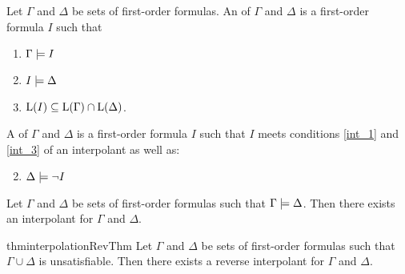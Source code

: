 \begin{defi}
	\label{def:interpolant}
	Let $\Gamma$ and $\Delta$ be sets of first-order formulas.
	An  of $\Gamma$ and $\Delta$ is a first-order formula $I$ such that 
	\begin{enumerate}
		\item $ \Gamma \models I$ \label{int_1}
		\item $ I \models \Delta $  \label{int_2}
		\item $ \operatorname{L}(I) \subseteq \operatorname{L}(\Gamma) \cap \operatorname{L}(\Delta)$.  \label{int_3}
	\end{enumerate}

	\begin{samepage}
		A  of $\Gamma$ and $\Delta$ is a first-order formula $I$ such that $I$ meets conditions \ref{int_1} and \ref{int_3} of an interpolant as well as:
		\begin{enumerate}[\quad\:1'.]
				\setcounter{enumi}{1}
			\item $ \Delta \models \lnot I $  \label{int_2prime}
				\qedhere
		\end{enumerate}
	\end{samepage}
\end{defi}

\begin{thm}[Interpolation]
	\label{thm:interpolation_original}
	Let $\Gamma$ and $\Delta$ be sets of first-order formulas such that $ \Gamma \models \Delta $.
	Then there exists an interpolant for $\Gamma$ and $\Delta$.
\end{thm}
%
\begin{restatable}{thm}{interpolationRevThm}
		\label{thm:interpolation}
		Let $\Gamma$ and $\Delta$ be sets of first-order formulas such that $ \Gamma \cup \Delta $ is unsatisfiable.
	Then there exists a reverse interpolant for $\Gamma$ and $\Delta$.
\end{restatable}



